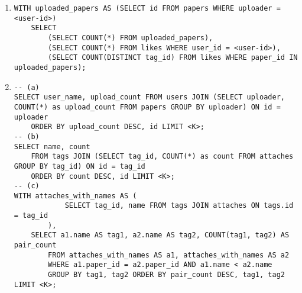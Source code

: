 \documentclass{article}
\begin{document}
\begin{enumerate}
\begin{enumerate}
        \item \begin{verbatim}
WITH uploaded_papers AS (SELECT id FROM papers WHERE uploader = <user-id>)
    SELECT
        (SELECT COUNT(*) FROM uploaded_papers),
        (SELECT COUNT(*) FROM likes WHERE user_id = <user-id>),
        (SELECT COUNT(DISTINCT tag_id) FROM likes WHERE paper_id IN uploaded_papers);
\end{verbatim}
  
        \item \begin{verbatim}
-- (a)
SELECT user_name, upload_count FROM users JOIN (SELECT uploader, COUNT(*) as upload_count FROM papers GROUP BY uploader) ON id = uploader
    ORDER BY upload_count DESC, id LIMIT <K>;
-- (b)
SELECT name, count
    FROM tags JOIN (SELECT tag_id, COUNT(*) as count FROM attaches GROUP BY tag_id) ON id = tag_id
    ORDER BY count DESC, id LIMIT <K>;
-- (c)
WITH attaches_with_names AS (
            SELECT tag_id, name FROM tags JOIN attaches ON tags.id = tag_id
        ),
    SELECT a1.name AS tag1, a2.name AS tag2, COUNT(tag1, tag2) AS pair_count
        FROM attaches_with_names AS a1, attaches_with_names AS a2
        WHERE a1.paper_id = a2.paper_id AND a1.name < a2.name
        GROUP BY tag1, tag2 ORDER BY pair_count DESC, tag1, tag2 LIMIT <K>;
\end{verbatim}
    \end{enumerate}
\end{enumerate}
\end{document}
